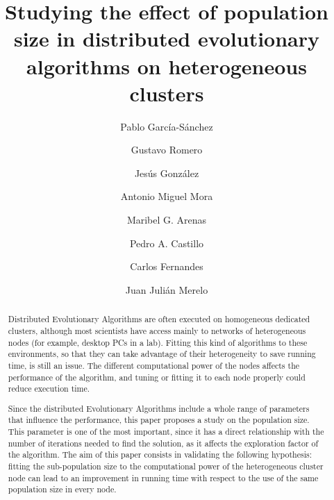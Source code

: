 \documentclass[final,1p,times]{elsarticle}
\begin{document}
\begin{frontmatter}



\title{Studying the effect of population size in distributed evolutionary
  algorithms on heterogeneous clusters}


\author[ugr]{Pablo Garc\'ia-S\'anchez}
\author[ugr]{Gustavo Romero}
\author[ugr]{Jes\'us Gonz\'alez}
\author[ugr]{Antonio Miguel Mora}
\author[ugr]{Maribel G. Arenas}
\author[ugr]{Pedro A. Castillo}
\author[laseeb]{Carlos Fernandes}
\author[ugr]{Juan Juli\'an Merelo}


\address[ugr]{Department of Computer Architecture and Computer Technology and CITIC-UGR, University of Granada, Granada, Spain. Tel: +34958241778. Fax: +34958248993}
\address[laseeb]{LaSEEB-ISR-IST, Technical University of Lisbon (IST), Lisbon, Portugal}%


\begin{abstract}


Distributed Evolutionary Algorithms are often executed on homogeneous dedicated clusters, 
although most scientists have access mainly to networks of heterogeneous nodes (for example, desktop PCs in a lab). 
Fitting this kind of algorithms to these environments, so that they
can take advantage of their heterogeneity to save running time, is
still an issue. The different computational power of the nodes affects
the performance of the algorithm, and tuning or fitting it
to each node properly could reduce execution time. 

Since the distributed Evolutionary Algorithms include a whole range of parameters that influence the performance, 
this paper proposes a study on the population size. This parameter  is one of the most important, 
since it has a direct relationship with the number of iterations needed to find the solution, as it affects
the exploration factor of the algorithm. 
The aim of this paper consists in validating the following hypothesis: fitting the sub-population size to the computational power of the heterogeneous cluster node can lead to an improvement in running time with respect to the use of the same population size in every node. 


\end{abstract}
\end{frontmatter}
\end{document}
